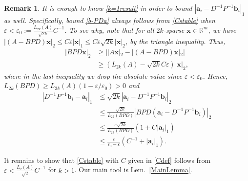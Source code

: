\documentclass[journal, twocolumn]{IEEEtran}
\newtheorem{remark}{Remark}
\begin{document}
\begin{remark}\label{b-PDaProof}
It is enough to know \eqref{k=1result} in order to bound $|\mathbf{a}_i - D^{-1}P^{-1}\mathbf{b}_i|_1$ as well. Specifically, bound \eqref{b-PDa} always follows from \eqref{Cstable} when $\varepsilon < \varepsilon_0 := \frac{L_{2k}(A)}{\sqrt{2k}}C^{-1}$. To see why, note that for all $2k$-sparse $\mathbf{x} \in \mathbb{R}^m$, we have $|(A-BPD)\mathbf{x}|_2 
\leq C\varepsilon|\mathbf{x}|_1
\leq C \varepsilon \sqrt{2k}  |\mathbf{x}|_2$,
by the triangle inequality. Thus,
\begin{align*}
|BPD\mathbf{x}|_2 
&\geq | |A\mathbf{x}|_2 - |(A-BPD)\mathbf{x}|_2 | \\
&\geq (L_{2k}(A) - \sqrt{2k}C\varepsilon ) |\mathbf{x}|_2,
\end{align*}
%
where in the last inequality we drop the absolute value since $\varepsilon < \varepsilon_0$. Hence, $L_{2k}(BPD) \geq L_{2k}(A)\left( 1 - \varepsilon/\varepsilon_0 \right) > 0$ and %
\begin{align*}
|D^{-1}P^{-1}\mathbf{b}_i - \mathbf{a}_i|_1
&\leq \sqrt{2k} |\mathbf{a}_i - D^{-1}P^{-1}\mathbf{b}_i|_2 \\
&\leq \frac{\sqrt{2k}}{L_{2k}(BPD)}|BPD(\mathbf{a}_i - D^{-1}P^{-1}\mathbf{b}_i)|_2 \\
&\leq \frac{\varepsilon\sqrt{2k}}{L_{2k}(BPD)}(1+C|\mathbf{a}_i|_1) \\
&\leq \frac{\varepsilon }{\varepsilon_0 - \varepsilon} \left( C^{-1}+|\mathbf{a}_i|_1 \right).
\end{align*}
\end{remark}

It remains to show that \eqref{Cstable} with $C$ given in \eqref{Cdef} follows from $\varepsilon < \frac{L_2(A)}{\sqrt{2}}C^{-1}$ for $k > 1$. Our main tool is Lem.~\ref{MainLemma}.
\end{document}
